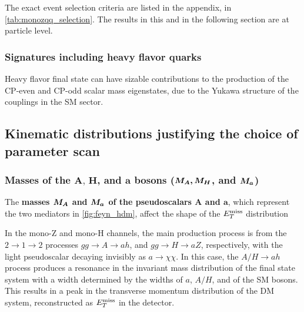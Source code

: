 The exact event selection criteria are listed in the appendix, in \autoref{tab:monozqq_selection}. The results in this and in the following section are at particle level. 

\subsubsection{Signatures including heavy flavor quarks}

Heavy flavor final state can have sizable contributions to the production of the CP-even and CP-odd scalar mass eigenstates, due to the Yukawa structure of the couplings in the SM sector. 

\subsection{Kinematic distributions justifying the choice of parameter scan}


\subsubsection[Masses of the $A,\,H$, and $a$ bosons ($\mA\,\mH$, and $\ma$)]{Masses of the $\boldsymbol{A,\,H}$, and $\boldsymbol{a}$ bosons ($\boldsymbol{M_{A},M_{H}}$, and $\boldsymbol{M_{a}}$)}

The \textbf{masses $\boldsymbol{M_{A}}$ and $\boldsymbol{M_{a}}$ of the pseudoscalars $\boldsymbol{A}$ and $\boldsymbol{a}$}, which represent the two mediators in \autoref{fig:feyn_hdm}, 
affect the shape of the $E_T^\mathrm{miss}$ distribution

In the mono-Z and mono-H channels, the main production process is from the $2\to1\to2$ processes $gg\to A\to a h$, and $gg\to H\to a Z$, respectively, with the light pseudoscalar decaying invisibly as $a\to \chi\chi$. 
In this case, the $A/H \to a h $ process produces a resonance in the invariant mass distribution of the final state system with a width determined by the widths of $a$, $A/H$, and of the SM bosons. 
This results in a peak in the transverse momentum distribution of the DM system, reconstructed as $E_T^\mathrm{miss}$ in the detector.

